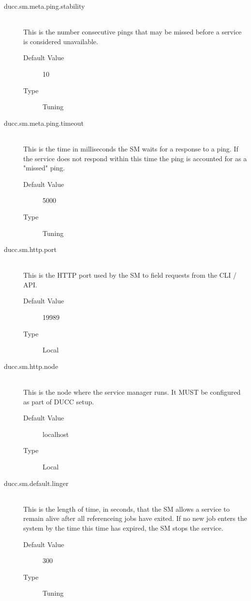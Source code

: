 \begin{description}
      \item[ducc.sm.meta.ping.stability] \hfill \\
        This is the number consecutive pings that may be missed before a service is considered 
        unavailable. 
        \begin{description}
          \item[Default Value] 10 
          \item[Type] Tuning 
        \end{description}

      \item[ducc.sm.meta.ping.timeout] \hfill \\
        This is the time in milliseconds the SM waits for a response to a ping. If the service does 
        not respond within this time the ping is accounted for as a "missed" ping. 
        \begin{description}
          \item[Default Value] 5000 
          \item[Type] Tuning 
        \end{description}
        
      \item[ducc.sm.http.port] \hfill \\
        This is the HTTP port used by the SM to field requests from the CLI / API. 
        \begin{description}          
          \item[Default Value] 19989 
          \item[Type] Local 
        \end{description}
        
      \item[ducc.sm.http.node] \hfill \\
        This is the node where the service manager runs. It MUST be configured as part of DUCC 
        setup. 
        \begin{description}
          \item[Default Value] localhost 
          \item[Type] Local 
        \end{description}
        
      \item[ducc.sm.default.linger] \hfill \\
        This is the length of time, in seconds, that the SM allows a service to remain alive after 
        all referenceing jobs have exited. If no new job enters the system by the time this time has 
        expired, the SM stops the service. 
        \begin{description}
          \item[Default Value] 300           
          \item[Type] Tuning 
        \end{description}
        
      \end{description}
      

